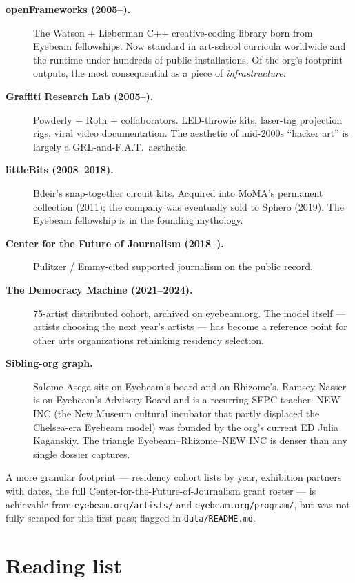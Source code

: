 \documentclass[10pt,letterpaper,twocolumn]{article}
\begin{document}
\begin{description}
\item[\textbf{openFrameworks (2005--).}] The Watson + Lieberman C++ creative-coding library born from Eyebeam fellowships. Now standard in art-school curricula worldwide and the runtime under hundreds of public installations. Of the org's footprint outputs, the most consequential as a piece of \emph{infrastructure}.
\item[\textbf{Graffiti Research Lab (2005--).}] Powderly + Roth + collaborators. LED-throwie kits, laser-tag projection rigs, viral video documentation. The aesthetic of mid-2000s ``hacker art'' is largely a GRL-and-F.A.T.~aesthetic.
\item[\textbf{littleBits (2008--2018).}] Bdeir's snap-together circuit kits. Acquired into MoMA's permanent collection (2011); the company was eventually sold to Sphero (2019). The Eyebeam fellowship is in the founding mythology.
\item[\textbf{Center for the Future of Journalism (2018--).}] Pulitzer / Emmy-cited supported journalism on the public record.
\item[\textbf{The Democracy Machine (2021--2024).}] 75-artist distributed cohort, archived on \href{https://eyebeam.org/program/the-democracy-machine/}{eyebeam.org}. The model itself --- artists choosing the next year's artists --- has become a reference point for other arts organizations rethinking residency selection.
\item[\textbf{Sibling-org graph.}] Salome Asega sits on Eyebeam's board and on Rhizome's. Ramsey Nasser is on Eyebeam's Advisory Board and is a recurring SFPC teacher. NEW INC (the New Museum cultural incubator that partly displaced the Chelsea-era Eyebeam model) was founded by the org's current ED Julia Kaganskiy. The triangle Eyebeam--Rhizome--NEW INC is denser than any single dossier captures.
\end{description}

A more granular footprint --- residency cohort lists by year, exhibition partners with dates, the full Center-for-the-Future-of-Journalism grant roster --- is achievable from \texttt{eyebeam.org/artists/} and \texttt{eyebeam.org/program/}, but was not fully scraped for this first pass; flagged in \texttt{data/README.md}.

\section{Reading list}
\end{document}
